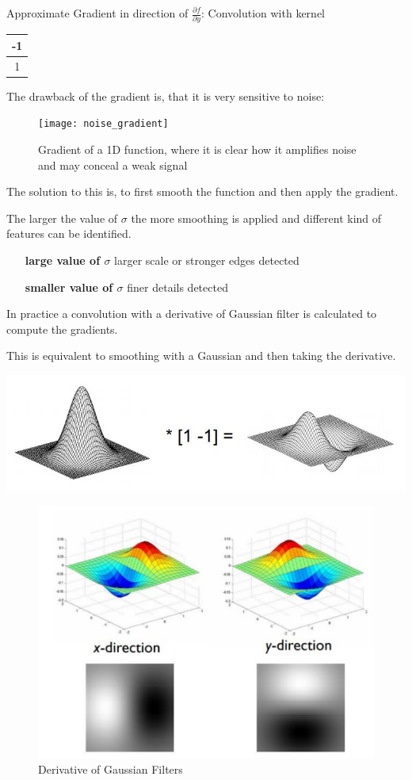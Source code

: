\noindent
Approximate Gradient in direction of $ \frac{\partial f}{\partial y} $: Convolution with kernel \begin{tabular}{|c|}
	\hline
	-1 \\
	\hline
	1\\
	\hline
\end{tabular}

The drawback of the gradient is, that it is very sensitive to noise:
\begin{figure}[H]
	\centering
	\texttt{[image: noise\_gradient]}
	\caption{Gradient of a 1D function, where it is clear how it amplifies noise and may conceal a weak signal}
	\label{fig:noisegradient}
\end{figure}

\noindent
The solution to this is, to first smooth the function and then apply the gradient.

The larger the value of $\sigma$ the more smoothing is applied and different kind of features can be identified.
\begin{itemize}[leftmargin=*, labelindent=3.5cm, labelsep=0.5cm]
	\item[\textbf{large value of $\sigma$}] larger scale or stronger edges detected
	\item[\textbf{smaller value of $\sigma$}] finer details detected
\end{itemize}

\noindent
\begin{minipage}{0.6\textwidth}
	In practice a convolution with a derivative of Gaussian filter is calculated to compute the gradients.

	This is equivalent to smoothing with a Gaussian and then taking the derivative.
\end{minipage}
\begin{minipage}{0.4\textwidth}
	\begin{center}
		\includegraphics[width=0.6\linewidth]{img/derivative_gaussian_filter}
	\end{center}
\end{minipage}

\begin{figure}[H]
	\centering
	\includegraphics[width=0.6\linewidth]{img/derivative_gaussian_filter2}
	\caption{Derivative of Gaussian Filters}
	\label{fig:derivativegaussianfilter2}
\end{figure}

